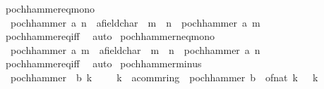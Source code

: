 \begin{isabellebody}
\endisatagproof
{\isafoldproof}%
%
\isadelimproof
\isanewline
%
\endisadelimproof
\isanewline
{}\isamarkupfalse%
\ pochhammer{\isacharunderscore}{\kern0pt}eq{\isacharunderscore}{\kern0pt}{}{\isacharunderscore}{\kern0pt}mono{\isacharcolon}{\kern0pt}\isanewline
\ \ {\isachardoublequoteopen}pochhammer\ a\ n\ {\isacharequal}{\kern0pt}\ {\isacharparenleft}{\kern0pt}{}{\isacharcolon}{\kern0pt}{\isacharcolon}{\kern0pt}{\isacharprime}{\kern0pt}a{\isacharcolon}{\kern0pt}{\isacharcolon}{\kern0pt}field{\isacharunderscore}{\kern0pt}char{\isacharunderscore}{\kern0pt}{}{\isacharparenright}{\kern0pt}\ {\isasymLongrightarrow}\ m\ {\isasymge}\ n\ {\isasymLongrightarrow}\ pochhammer\ a\ m\ {\isacharequal}{\kern0pt}\ {}{\isachardoublequoteclose}\isanewline
%
\isadelimproof
\ \ %
\endisadelimproof
%
\isatagproof
{}\isamarkupfalse%
\ pochhammer{\isacharunderscore}{\kern0pt}eq{\isacharunderscore}{\kern0pt}{}{\isacharunderscore}{\kern0pt}iff\ \isamarkupfalse%
\ auto%
\endisatagproof
{\isafoldproof}%
%
\isadelimproof
\isanewline
%
\endisadelimproof
\isanewline
{}\isamarkupfalse%
\ pochhammer{\isacharunderscore}{\kern0pt}neq{\isacharunderscore}{\kern0pt}{}{\isacharunderscore}{\kern0pt}mono{\isacharcolon}{\kern0pt}\isanewline
\ \ {\isachardoublequoteopen}pochhammer\ a\ m\ {\isasymnoteq}\ {\isacharparenleft}{\kern0pt}{}{\isacharcolon}{\kern0pt}{\isacharcolon}{\kern0pt}{\isacharprime}{\kern0pt}a{\isacharcolon}{\kern0pt}{\isacharcolon}{\kern0pt}field{\isacharunderscore}{\kern0pt}char{\isacharunderscore}{\kern0pt}{}{\isacharparenright}{\kern0pt}\ {\isasymLongrightarrow}\ m\ {\isasymge}\ n\ {\isasymLongrightarrow}\ pochhammer\ a\ n\ {\isasymnoteq}\ {}{\isachardoublequoteclose}\isanewline
%
\isadelimproof
\ \ %
\endisadelimproof
%
\isatagproof
{}\isamarkupfalse%
\ pochhammer{\isacharunderscore}{\kern0pt}eq{\isacharunderscore}{\kern0pt}{}{\isacharunderscore}{\kern0pt}iff\ \isamarkupfalse%
\ auto%
\endisatagproof
{\isafoldproof}%
%
\isadelimproof
\isanewline
%
\endisadelimproof
\isanewline
{}\isamarkupfalse%
\ pochhammer{\isacharunderscore}{\kern0pt}minus{\isacharcolon}{\kern0pt}\isanewline
\ \ {\isachardoublequoteopen}pochhammer\ {\isacharparenleft}{\kern0pt}{\isacharminus}{\kern0pt}\ b{\isacharparenright}{\kern0pt}\ k\ {\isacharequal}{\kern0pt}\ {\isacharparenleft}{\kern0pt}{\isacharparenleft}{\kern0pt}{\isacharminus}{\kern0pt}\ {}{\isacharparenright}{\kern0pt}\ {\isacharcircum}{\kern0pt}\ k\ {\isacharcolon}{\kern0pt}{\isacharcolon}{\kern0pt}\ {\isacharprime}{\kern0pt}a{\isacharcolon}{\kern0pt}{\isacharcolon}{\kern0pt}comm{\isacharunderscore}{\kern0pt}ring{\isacharunderscore}{\kern0pt}{}{\isacharparenright}{\kern0pt}\ {\isacharasterisk}{\kern0pt}\ pochhammer\ {\isacharparenleft}{\kern0pt}b\ {\isacharminus}{\kern0pt}\ of{\isacharunderscore}{\kern0pt}nat\ k\ {\isacharplus}{\kern0pt}\ {}{\isacharparenright}{\kern0pt}\ k{\isachardoublequoteclose}\isanewline

\end{isabellebody}
